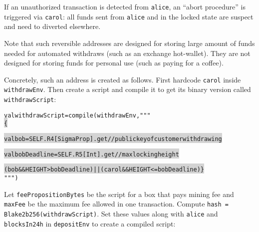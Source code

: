 \documentclass[11pt]{article}
\newcommand\Hi[2][lightgray]{%
	\hspace*{-\fboxsep}%
	\colorbox{#1}{#2}%
	\hspace*{-\fboxsep}%
}
\begin{document}
If an unauthorized transaction is detected from \texttt{alice}, an ``abort procedure'' is triggered via \texttt{carol}: all funds sent from \texttt{alice} and in the locked state are suspect and need to diverted elsewhere. %

Note that such reversible addresses are designed for storing large amount of funds needed for automated withdraws (such as an exchange hot-wallet). They are not designed for storing funds for personal use (such as paying for a coffee). 

Concretely, such an address is created as follows. First hardcode \texttt{carol} inside \texttt{withdrawEnv}. Then create a script and compile it to get its binary version called \texttt{withdrawScript}:
\begin{alltt}
val withdrawScript = compile(withdrawEnv, """ \Hi{\{}
  \Hi{val bob         = SELF.R4[SigmaProp].get // public key of customer withdrawing}
  \Hi{val bobDeadline = SELF.R5[Int].get       // max locking height}
  \Hi{(bob && HEIGHT > bobDeadline) || (carol && HEIGHT <= bobDeadline) \}} """)
\end{alltt}

Let \texttt{feePropositionBytes} be the script for a box that pays mining fee and \texttt{maxFee} be the maximum fee allowed in one transaction. 
Compute \texttt{hash = Blake2b256(withdrawScript)}. Set these values along with \texttt{alice} and \texttt{blocksIn24h} in \texttt{depositEnv} to create a compiled script: %

%
%
%
%
\end{document}

